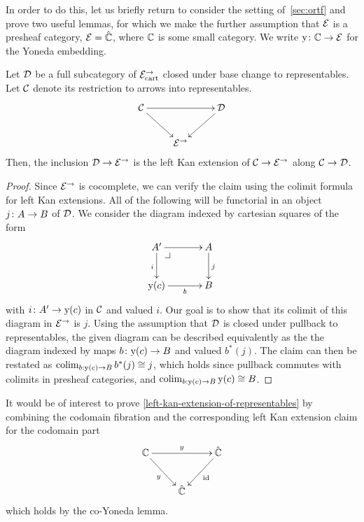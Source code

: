 \documentclass[reqno,10pt,a4paper,oneside]{amsart}
\begin{document}
\medskip

\newcommand{\yon}{\mathrm{y}} 

In order to do this, let us briefly return to consider the setting of~\cref{sec:ortf} and prove two useful lemmas,
for which we make the further assumption that $\catE$ is a presheaf category, \ie $\catE = \hat{\cat{C}}$, where $\catC$ is some small category. We write $\yon \co \cat{C} \to \catE$ for the Yoneda embedding.

\begin{lemma}
\label{left-kan-extension-of-representables}
Let $\cal{D}$ be a full subcategory of $\catE_{\cart}^{\to}$ closed under base change to representables.
Let $\cal{C}$ denote its restriction to arrows into representables.
\[
\xymatrix{
  \cal{C}
  \ar[rr]
  \ar[dr]
&&
  \cal{D}
  \ar[dl]
\\&
  \catE^{\to}
}
\]
Then, the inclusion $\cal{D} \to \catE^{\to}$ is the left Kan extension of $\cal{C} \to \catE^{\to}$ along $\cal{C} \to \cal{D}$.
\end{lemma}



\begin{proof}
Since $\catE^{\to}$ is cocomplete, we can verify the claim using  the colimit formula for left Kan extensions.
All of the following will be functorial in an object $j \co A \to B$ of $\cal{D}$.
We consider the diagram indexed by cartesian squares of the form
\[
\xymatrix@C=1.2cm{
  A'
  \ar[r]
  \ar[d]_{i}
  \pullback{dr}
&
  A
  \ar[d]^{j}
\\
  \yon(c) 
  \ar[r]_-b 
&
  B
}
\]
with $i \co A' \to \yon(c)$ in $\cal{C}$ and valued $i$.
Our goal is to show that its colimit of this diagram in $\catE^{\to}$ is $j$.
Using the assumption that $\cal{D}$ is closed under pullback to representables, the given diagram
can be described equivalently as the the diagram indexed by maps $b \co \yon(c) \to B$ and valued $b^*(j)$. The claim can then be restated as  $\colim_{b : \yon(c) \to B} b^*(j) \iso j$, which 
holds since pullback commutes with colimits in presheaf categories, and  $\colim_{b : \yon(c) \to B} \yon(c) \iso B$.
\end{proof}


\begin{remark} It would be of interest to prove \cref{left-kan-extension-of-representables} by combining 
the codomain fibration and the corresponding left Kan extension claim for the codomain part
\[
\xymatrix{
  \cat{C}
  \ar[rr]^{y}
  \ar[dr]_{y}
&&
  \hat{\catC}
  \ar[dl]^{\id}
\\&
  \hat{\cat{C}}
}
\]
which holds by the co-Yoneda lemma.
\end{remark}
\end{document}
